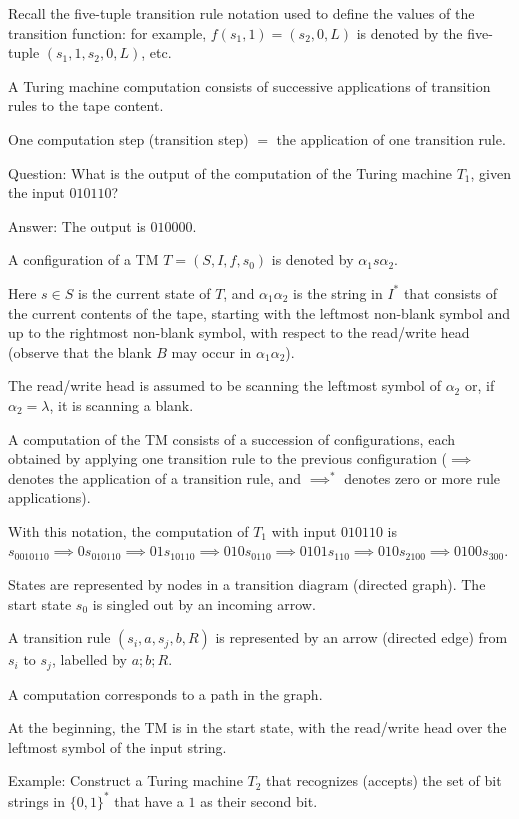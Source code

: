 \documentclass{article}
\begin{document}
Recall the five-tuple transition rule notation used to define the values of the transition function: for example, $f(s_1, 1) = (s_2, 0, L)$ is denoted by the five-tuple $(s_1, 1, s_2, 0, L)$, etc.

A Turing machine computation consists of successive applications of transition rules to the tape content. 

One computation step (transition step) $=$ the application of one transition rule.

Question: What is the output of the computation of the Turing machine $T_1$, given the input $010110$?

Answer: The output is $010000$.

A configuration of a TM $T = (S, I, f, s_0)$ is denoted by $\alpha_1 s \alpha_2$. 

Here $s \in S$ is the current state of $T$, and $\alpha_1 \alpha_2$ is the string in $I^*$ that consists of the current contents of the tape, starting with the leftmost non-blank symbol and up to the rightmost non-blank symbol, with respect to the read/write head (observe that the blank $B$ may occur in $\alpha_1 \alpha_2$).

The read/write head is assumed to be scanning the leftmost symbol of $\alpha_2$ or, if $\alpha_2 = \lambda$, it is scanning a blank.

A computation of the TM consists of a succession of configurations, each obtained by applying one transition rule to the previous configuration ($\implies$ denotes the application of a transition rule, and $\implies^*$ denotes zero or more rule applications).

With this notation, the computation of $T_1$ with input $010110$ is $s_0010110 \implies 0s_010110 \implies 01s_10110 \implies 010s_0110 \implies 0101s_110 \implies 010s_2100 \implies 0100s_300$.

States are represented by nodes in a transition diagram (directed graph). The start state $s_0$ is singled out by an incoming arrow. 

A transition rule $(s_i, a, s_j, b, R)$ is represented by an arrow (directed edge) from $s_i$ to $s_j$, labelled by $a;b;R$.

A computation corresponds to a path in the graph.

At the beginning, the TM is in the start state, with the read/write head over the leftmost symbol of the input string.

Example:  Construct a Turing machine $T_2$ that recognizes (accepts) the set of bit strings in $\{0,1\}^*$ that have a $1$ as their second bit.
\end{document}
